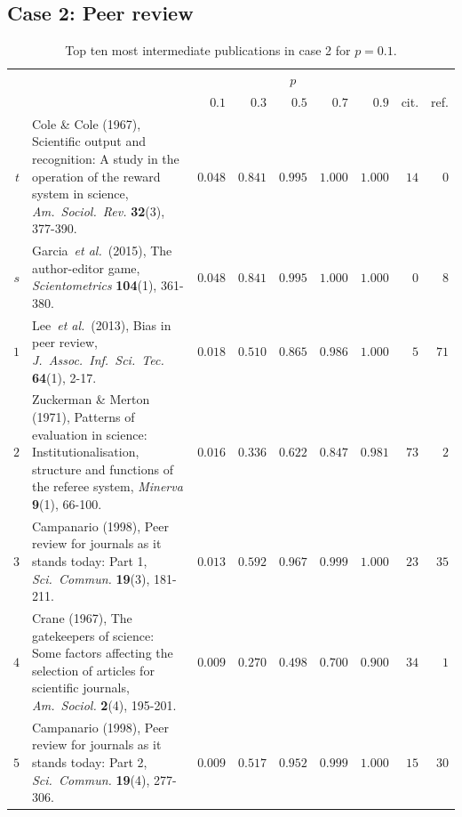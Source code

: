 \documentclass[9pt,twocolumn,twoside,lineno]{pnas-alt}
\theoremstyle{definition}
\renewcommand{\etal}{~\emph{et al.}\xspace}
\begin{document}
%
%

\subsection*{\label{sec:pr}Case 2: Peer review}

\begin{sansmath}\begin{table}%
  \caption{Top ten most intermediate publications in case 2 for $p = 0.1$.}
  \begin{tabular}{rp{9.75cm}rrrrrrr}
    & & \multicolumn{5}{c}{$p$} \\\cmidrule{3-7}
    & & $0.1$ & $0.3$ & $0.5$ & $0.7$ & $0.9$ & cit. & ref. \\\midrule
    $t$ & Cole \& Cole (1967), Scientific output and recognition: A study in the operation of the reward system in science, \textit{Am.\ Sociol.\ Rev.} \textbf{32}(3), 377-390. & $0.048$ & $0.841$ & $0.995$ & $1.000$ & $1.000$ & $14$ & $0$ \\
    $s$ & Garcia\etal~(2015), The author-editor game, \textit{Scientometrics} \textbf{104}(1), 361-380. & $0.048$ & $0.841$ & $0.995$ & $1.000$ & $1.000$ & $0$ & $8$ \\\midrule
    $1$ & Lee\etal~(2013), Bias in peer review, \textit{J.\ Assoc.\ Inf.\ Sci.\ Tec.} \textbf{64}(1), 2-17. & $0.018$ & $0.510$ & $0.865$ & $0.986$ & $1.000$ & $5$ & $71$ \\
    $2$ & Zuckerman \& Merton (1971), Patterns of evaluation in science: Institutionalisation, structure and functions of the referee system, \textit{Minerva} \textbf{9}(1), 66-100. & $0.016$ & $0.336$ & $0.622$ & $0.847$ & $0.981$ & $73$ & $2$ \\
    $3$ & Campanario (1998), Peer review for journals as it stands today: Part 1, \textit{Sci.\ Commun.} \textbf{19}(3), 181-211. & $0.013$ & $0.592$ & $0.967$ & $0.999$ & $1.000$ & $23$ & $35$ \\
    $4$ & Crane (1967), The gatekeepers of science: Some factors affecting the selection of articles for scientific journals, \textit{Am.\ Sociol.} \textbf{2}(4), 195-201. & $0.009$ & $0.270$ & $0.498$ & $0.700$ & $0.900$ & $34$ & $1$ \\
    $5$ & Campanario (1998), Peer review for journals as it stands today: Part 2, \textit{Sci.\ Commun.} \textbf{19}(4), 277-306. & $0.009$ & $0.517$ & $0.952$ & $0.999$ & $1.000$ & $15$ & $30$ \\

\end{tabular}
\end{table}
\end{sansmath}
\end{document}
